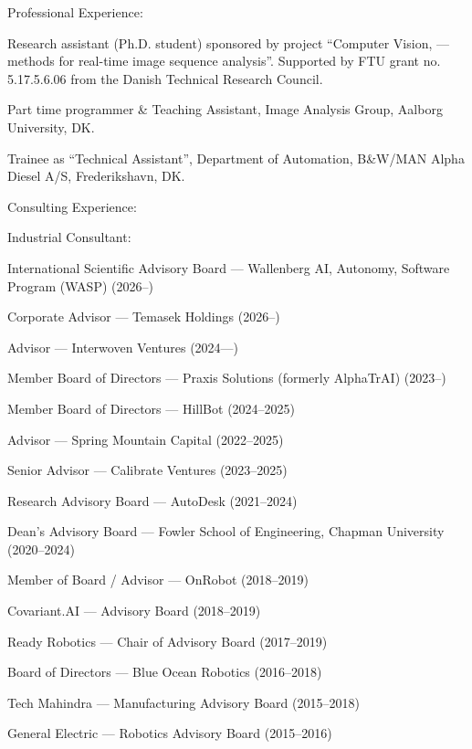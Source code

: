 \documentclass{article}
\newenvironment{sublist}{%
  \begin{list}{}{%
      \setlength{\itemsep}{0em}\setlength{\parsep}{0em}%
      \setlength{\topsep}{0em}\setlength{\parskip}{0em}%
    }%
}%
{ \end{list} }
\begin{document}
\begin{cv}
\begin{cvlist}{Professional Experience:}
		\item[July 1987--Sept. 1989] Research assistant (Ph.D. student) sponsored
		by project ``Computer Vision, --- methods for real-time image
		sequence analysis''. Supported by FTU grant no. 5.17.5.6.06 from the
		Danish Technical Research Council.

		\item[1986--1987] Part time programmer \& Teaching Assistant,
		Image Analysis Group, Aalborg University, DK.\@

		\item[1980] Trainee as ``Technical Assistant'', Department of
		Automation, B\&W/MAN Alpha Diesel A/S, Frederikshavn, DK.\@
	\end{cvlist}


	\begin{cvlist}{Consulting Experience:}
		\item Industrial Consultant:
		\begin{sublist}
      \item International Scientific Advisory Board --- Wallenberg AI, Autonomy, Software Program (WASP) (2026--) 
			\item Corporate Advisor --- Temasek Holdings (2026--)
			\item Advisor --- Interwoven Ventures (2024---)
			\item Member Board of Directors --- Praxis Solutions (formerly AlphaTrAI) (2023--)
			\item Member Board of Directors --- HillBot (2024--2025)
			\item Advisor --- Spring Mountain Capital (2022--2025)
			\item Senior Advisor --- Calibrate Ventures (2023--2025)
			\item Research Advisory Board --- AutoDesk (2021--2024)
			\item Dean's Advisory Board --- Fowler School of Engineering, Chapman University (2020--2024)
			\item Member of Board / Advisor --- OnRobot  (2018--2019)
			\item Covariant.AI --- Advisory Board (2018--2019)
			\item Ready Robotics --- Chair of Advisory Board (2017--2019)
			\item Board of Directors --- Blue Ocean Robotics (2016--2018)
			\item Tech Mahindra --- Manufacturing Advisory Board (2015--2018)
			\item General Electric --- Robotics Advisory Board (2015--2016)

\end{sublist}
\end{cvlist}
\end{cv}
\end{document}
